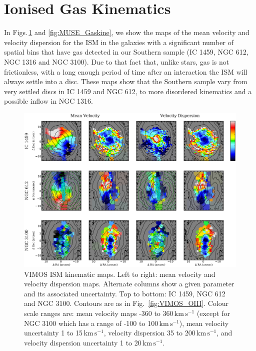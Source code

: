		
		





\section{Ionised Gas Kinematics}
	\label{sec:GasKin}
	In Figs.\,\ref{fig:VIMOS_Gaskine} and \ref{fig:MUSE_Gaskine}, we show the maps of the mean velocity and velocity dispersion for the ISM in the galaxies with a significant number of spatial bins that have gas detected in our Southern sample (IC 1459, NGC 612, NGC 1316 and NGC 3100). Due to that fact that, unlike stars, gas is not frictionless, with a long enough period of time after an interaction the ISM will always settle into a disc. These maps show that the Southern sample vary from very settled discs in IC 1459 and NGC 612, to more disordered kinematics and a possible inflow in NGC 1316.

	\begin{figure}
		\centering
		\includegraphics[height=0.47\textheight]{chapter5/vimos/kin.png}
		\caption[VIMOS ISM kinematic maps]{VIMOS ISM kinematic maps. Left to right: mean velocity and velocity dispersion maps. Alternate columns show a given parameter and its associated uncertainty. Top to bottom: IC 1459, NGC 612 and NGC 3100. Contours are as in Fig.\ \ref{fig:VIMOS_OIII}. Colour scale ranges are: mean velocity maps -360 to 360\,$\mathrm{km \, s^{-1}}$ (except for NGC 3100 which has a range of -100 to 100\,$\mathrm{km \, s^{-1}}$), mean velocity uncertainty 1 to 15\,$\mathrm{km \, s^{-1}}$, velocity dispersion 35 to 200\,$\mathrm{km \, s^{-1}}$, and velocity dispersion uncertainty 1 to 20\,$\mathrm{km \, s^{-1}}$.} 
		\label{fig:VIMOS_Gaskine}
	\end{figure}

